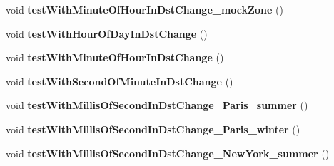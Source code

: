 \begin{DoxyCompactItemize}
\item 
\hypertarget{classorg_1_1joda_1_1time_1_1_test_date_time_zone_cutover_a0dd3634857843781a4cb80f3bd36e934}{void {\bfseries test\-With\-Minute\-Of\-Hour\-In\-Dst\-Change\-\_\-mock\-Zone} ()}\label{classorg_1_1joda_1_1time_1_1_test_date_time_zone_cutover_a0dd3634857843781a4cb80f3bd36e934}

\item 
\hypertarget{classorg_1_1joda_1_1time_1_1_test_date_time_zone_cutover_a4d23c6c74fbcc63055d07b49aad599b1}{void {\bfseries test\-With\-Hour\-Of\-Day\-In\-Dst\-Change} ()}\label{classorg_1_1joda_1_1time_1_1_test_date_time_zone_cutover_a4d23c6c74fbcc63055d07b49aad599b1}

\item 
\hypertarget{classorg_1_1joda_1_1time_1_1_test_date_time_zone_cutover_a9f9eff2455fc0ca242e02e626c7da9a1}{void {\bfseries test\-With\-Minute\-Of\-Hour\-In\-Dst\-Change} ()}\label{classorg_1_1joda_1_1time_1_1_test_date_time_zone_cutover_a9f9eff2455fc0ca242e02e626c7da9a1}

\item 
\hypertarget{classorg_1_1joda_1_1time_1_1_test_date_time_zone_cutover_a498c61d1de7a8ca8f0ba6f29672839e1}{void {\bfseries test\-With\-Second\-Of\-Minute\-In\-Dst\-Change} ()}\label{classorg_1_1joda_1_1time_1_1_test_date_time_zone_cutover_a498c61d1de7a8ca8f0ba6f29672839e1}

\item 
\hypertarget{classorg_1_1joda_1_1time_1_1_test_date_time_zone_cutover_ac3d5fd2f6fdfa520ca512f305b3dfce6}{void {\bfseries test\-With\-Millis\-Of\-Second\-In\-Dst\-Change\-\_\-\-Paris\-\_\-summer} ()}\label{classorg_1_1joda_1_1time_1_1_test_date_time_zone_cutover_ac3d5fd2f6fdfa520ca512f305b3dfce6}

\item 
\hypertarget{classorg_1_1joda_1_1time_1_1_test_date_time_zone_cutover_ad36536224f40be18181e5ef12d319129}{void {\bfseries test\-With\-Millis\-Of\-Second\-In\-Dst\-Change\-\_\-\-Paris\-\_\-winter} ()}\label{classorg_1_1joda_1_1time_1_1_test_date_time_zone_cutover_ad36536224f40be18181e5ef12d319129}

\item 
\hypertarget{classorg_1_1joda_1_1time_1_1_test_date_time_zone_cutover_ae577228a074be53bae1fd9e04fb05d8d}{void {\bfseries test\-With\-Millis\-Of\-Second\-In\-Dst\-Change\-\_\-\-New\-York\-\_\-summer} ()}\label{classorg_1_1joda_1_1time_1_1_test_date_time_zone_cutover_ae577228a074be53bae1fd9e04fb05d8d}


\end{DoxyCompactItemize}
